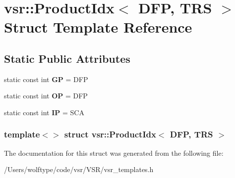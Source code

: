 \hypertarget{structvsr_1_1_product_idx_3_01_d_f_p_00_01_t_r_s_01_4}{\section{vsr\-:\-:Product\-Idx$<$ D\-F\-P, T\-R\-S $>$ Struct Template Reference}
\label{structvsr_1_1_product_idx_3_01_d_f_p_00_01_t_r_s_01_4}
}
\subsection*{Static Public Attributes}
\begin{DoxyCompactItemize}
\item 
\hypertarget{structvsr_1_1_product_idx_3_01_d_f_p_00_01_t_r_s_01_4_a700e40108bbe9941f4c5d55d30e3754d}{static const int {\bfseries G\-P} = D\-F\-P}\label{structvsr_1_1_product_idx_3_01_d_f_p_00_01_t_r_s_01_4_a700e40108bbe9941f4c5d55d30e3754d}

\item 
\hypertarget{structvsr_1_1_product_idx_3_01_d_f_p_00_01_t_r_s_01_4_ad63dba214de74e3e4ec43cc03f44d628}{static const int {\bfseries O\-P} = D\-F\-P}\label{structvsr_1_1_product_idx_3_01_d_f_p_00_01_t_r_s_01_4_ad63dba214de74e3e4ec43cc03f44d628}

\item 
\hypertarget{structvsr_1_1_product_idx_3_01_d_f_p_00_01_t_r_s_01_4_a3087bdf5ff0b419b1f4c762a84c28026}{static const int {\bfseries I\-P} = S\-C\-A}\label{structvsr_1_1_product_idx_3_01_d_f_p_00_01_t_r_s_01_4_a3087bdf5ff0b419b1f4c762a84c28026}

\end{DoxyCompactItemize}
\subsubsection*{template$<$$>$ struct vsr\-::\-Product\-Idx$<$ D\-F\-P, T\-R\-S $>$}



The documentation for this struct was generated from the following file\-:\begin{DoxyCompactItemize}
\item 
/\-Users/wolftype/code/vsr/\-V\-S\-R/vsr\-\_\-templates.\-h\end{DoxyCompactItemize}
